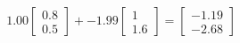 \documentclass[preview]{standalone}
\begin{document}
\begin{align*}
1.00 \begin{bmatrix} 0.8 \\ 0.5 \end{bmatrix} + -1.99 \begin{bmatrix} 1 \\ 1.6 \end{bmatrix} = \begin{bmatrix} -1.19 \\ -2.68 \end{bmatrix}
\end{align*}
\end{document}
